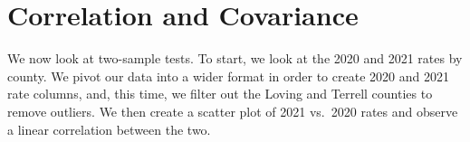 \documentclass[
  letterpaper,
]{latex/krantz}
\makeatletter
\newenvironment{Shaded}{\begin{snugshade}}{\end{snugshade}}
\newcommand{\AttributeTok}[1]{\textcolor[rgb]{0.40,0.45,0.13}{#1}}
\newcommand{\CommentTok}[1]{\textcolor[rgb]{0.37,0.37,0.37}{#1}}
\newcommand{\FloatTok}[1]{\textcolor[rgb]{0.68,0.00,0.00}{#1}}
\newcommand{\FunctionTok}[1]{\textcolor[rgb]{0.28,0.35,0.67}{#1}}
\newcommand{\NormalTok}[1]{\textcolor[rgb]{0.00,0.23,0.31}{#1}}
\newcommand{\OtherTok}[1]{\textcolor[rgb]{0.00,0.23,0.31}{#1}}
\newcommand{\SpecialCharTok}[1]{\textcolor[rgb]{0.37,0.37,0.37}{#1}}
\newcommand{\StringTok}[1]{\textcolor[rgb]{0.13,0.47,0.30}{#1}}
\newenvironment{kframe}{%
\medskip{}
\setlength{\fboxsep}{.8em}
 \def\at@end@of@kframe{}%
 \ifinner\ifhmode%
  \def\at@end@of@kframe{\end{minipage}}%
  \begin{minipage}{\columnwidth}%
 \fi\fi%
 \def\FrameCommand##1{\hskip\@totalleftmargin \hskip-\fboxsep
 \colorbox{shadecolor}{##1}\hskip-\fboxsep
     \hskip-\linewidth \hskip-\@totalleftmargin \hskip\columnwidth}%
 \MakeFramed {\advance\hsize-\width
   \@totalleftmargin\z@ \linewidth\hsize
   \@setminipage}}%
 {\par\unskip\endMakeFramed%
 \at@end@of@kframe}
\renewenvironment{Shaded}{\begin{kframe}}{\end{kframe}}
\makeatother
\begin{document}
\begin{Shaded}
\end{Shaded}

\section{\texorpdfstring{Correlation and Covariance 
}{Correlation and Covariance  }}\label{correlation-and-covariance}

We now look at two-sample tests. To start, we look at the 2020 and 2021
rates by county. We pivot our data into a wider format in order to
create 2020 and 2021 rate columns, and, this time, we filter out the
Loving and Terrell counties to remove outliers. We then create a scatter
plot of 2021 vs.~2020 rates and observe a linear correlation between the
two.
\end{document}
